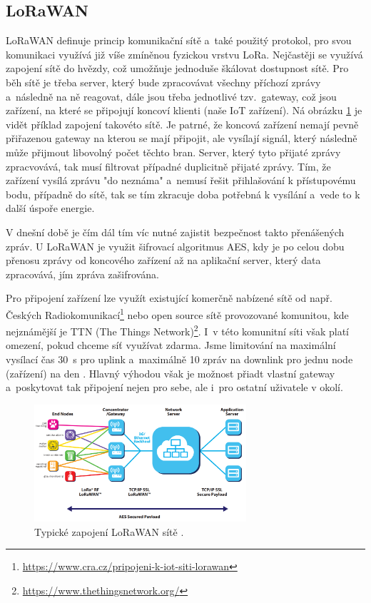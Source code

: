\subsection{LoRaWAN}

LoRaWAN definuje princip komunikační sítě a~také použitý protokol, pro svou komunikaci využívá již víše zmíněnou fyzickou vrstvu LoRa. Nejčastěji se využívá zapojení sítě do hvězdy, což umožňuje jednoduše škálovat dostupnost sítě. Pro běh sítě je třeba server, který bude zpracovávat všechny příchozí zprávy a~následně na ně reagovat, dále jsou třeba jednotlivé tzv.~gateway, což jsou zařízení, na které se připojují koncoví klienti (naše IoT zařízení). Ná obrázku \ref{fig_LoRaWANNetwork} je vidět příklad zapojení takovéto sítě. Je patrné, že koncová zařízení nemají pevně přiřazenou gateway na kterou se mají připojit, ale vysílají signál, který následně může přijmout libovolný počet těchto bran. Server, který tyto přijaté zprávy zpracvovává, tak musí filtrovat případné duplicitně přijaté zprávy. Tím, že zařízení vysílá zprávu "do neznáma" a~nemusí řešit přihlašování k přístupovému bodu, případně do sítě, tak se tím zkracuje doba potřebná k vysílání a~vede to k další úspoře energie.

V dnešní době je čím dál tím víc nutné zajistit bezpečnost takto přenášených zpráv. U LoRaWAN je využit šifrovací algoritmus AES, kdy je po celou dobu přenosu zprávy od koncového zařízení až na aplikační server, který data zpracovává, jím zpráva zašifrována.

Pro připojení zařízení lze využít existující komerčně nabízené sítě od např. Českých Radiokomunikací\footnote{\url{https://www.cra.cz/pripojeni-k-iot-siti-lorawan}} nebo open source sítě provozované komunitou, kde nejznámější je TTN (The Things Network)\footnote{\url{https://www.thethingsnetwork.org/}}. I~v této komunitní síti však platí omezení, pokud chceme síť využívat zdarma. Jsme limitování na maximální vysílací čas \SI{30}{\second} pro uplink a~maximálně 10 zpráv na downlink pro jednu node (zařízení) na den \cite{TTN_fair_use}. Hlavný výhodou však je možnost přiadt vlastní gateway a~poskytovat tak připojení nejen pro sebe, ale i~pro ostatní uživatele v okolí.

\begin{figure}
    \centering
    \includegraphics[width=0.7\textwidth]{obrazky/lorawanNetwork.png}
    \caption[Typické zapojení LoRaWAN sítě.]{Typické zapojení LoRaWAN sítě \cite{LoRaWAN_pdf}.}
    \label{fig_LoRaWANNetwork}
\end{figure}

